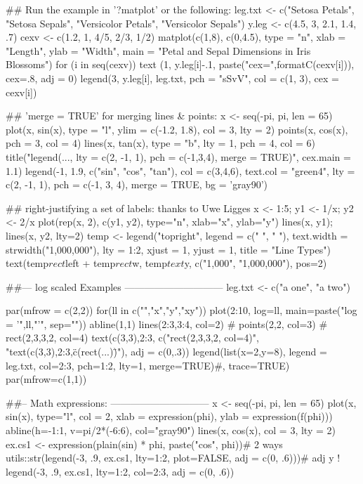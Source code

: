 \begin{Examples}
\begin{ExampleCode}
## Run the example in '?matplot' or the following:
leg.txt <- c("Setosa     Petals", "Setosa     Sepals",
             "Versicolor Petals", "Versicolor Sepals")
y.leg <- c(4.5, 3, 2.1, 1.4, .7)
cexv  <- c(1.2, 1, 4/5, 2/3, 1/2)
matplot(c(1,8), c(0,4.5), type = "n", xlab = "Length", ylab = "Width",
        main = "Petal and Sepal Dimensions in Iris Blossoms")
for (i in seq(cexv)) {
  text  (1, y.leg[i]-.1, paste("cex=",formatC(cexv[i])), cex=.8, adj = 0)
  legend(3, y.leg[i], leg.txt, pch = "sSvV", col = c(1, 3), cex = cexv[i])
}

## 'merge = TRUE' for merging lines & points:
x <- seq(-pi, pi, len = 65)
plot(x, sin(x), type = "l", ylim = c(-1.2, 1.8), col = 3, lty = 2)
points(x, cos(x), pch = 3, col = 4)
lines(x, tan(x), type = "b", lty = 1, pch = 4, col = 6)
title("legend(..., lty = c(2, -1, 1), pch = c(-1,3,4), merge = TRUE)",
      cex.main = 1.1)
legend(-1, 1.9, c("sin", "cos", "tan"), col = c(3,4,6),
       text.col = "green4", lty = c(2, -1, 1), pch = c(-1, 3, 4),
       merge = TRUE, bg = 'gray90')

## right-justifying a set of labels: thanks to Uwe Ligges
x <- 1:5; y1 <- 1/x; y2 <- 2/x
plot(rep(x, 2), c(y1, y2), type="n", xlab="x", ylab="y")
lines(x, y1); lines(x, y2, lty=2)
temp <- legend("topright", legend = c(" ", " "),
               text.width = strwidth("1,000,000"),
               lty = 1:2, xjust = 1, yjust = 1,
               title = "Line Types")
text(temp$rect$left + temp$rect$w, temp$text$y,
     c("1,000", "1,000,000"), pos=2)


##--- log scaled Examples ------------------------------
leg.txt <- c("a one", "a two")

par(mfrow = c(2,2))
for(ll in c("","x","y","xy")) {
  plot(2:10, log=ll, main=paste("log = '",ll,"'", sep=""))
  abline(1,1)
  lines(2:3,3:4, col=2) #
  points(2,2, col=3)    #
  rect(2,3,3,2, col=4)
  text(c(3,3),2:3, c("rect(2,3,3,2, col=4)",
                     "text(c(3,3),2:3,\"c(rect(...)\")"), adj = c(0,.3))
  legend(list(x=2,y=8), legend = leg.txt, col=2:3, pch=1:2,
         lty=1, merge=TRUE)#, trace=TRUE)
}
par(mfrow=c(1,1))

##-- Math expressions:  ------------------------------
x <- seq(-pi, pi, len = 65)
plot(x, sin(x), type="l", col = 2, xlab = expression(phi),
     ylab = expression(f(phi)))
abline(h=-1:1, v=pi/2*(-6:6), col="gray90")
lines(x, cos(x), col = 3, lty = 2)
ex.cs1 <- expression(plain(sin) * phi,  paste("cos", phi))# 2 ways
utils::str(legend(-3, .9, ex.cs1, lty=1:2, plot=FALSE,
           adj = c(0, .6)))# adj y !
legend(-3, .9, ex.cs1, lty=1:2, col=2:3,    adj = c(0, .6))


\end{ExampleCode}
\end{Examples}
